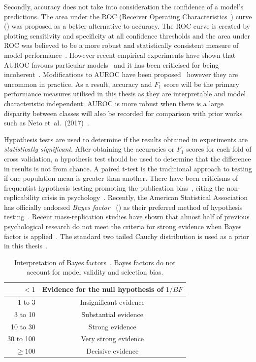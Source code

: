 \documentclass[12pt, twoside]{book}
\renewcommand\emph[1]{\textit{\color{USred}{#1}}}
\begin{document}
Secondly, accuracy does not take into consideration the confidence of a model's predictions. The area under the ROC (Receiver Operating Characteristics~\cite{rocauc}) curve (\emph{AUROC}) was proposed as a better alternative to accuracy. The ROC curve is created by plotting sensitivity and specificity at all confidence thresholds and the area under ROC was believed to be a more robust and statistically consistent measure of model performance~\cite{aucgood}. However recent empirical experiments have shown that AUROC favours particular models~\cite{aucmislead2} and it has been criticised for being incoherent~\cite{aucmislead, aucincoherent}. Modifications to AUROC have been proposed~\cite{aucmislead2, aucincoherent} however they are uncommon in practice. As a result, accuracy and $F_1$ score will be the primary performance measures utilised in this thesis as they are interpretable and model characteristic independent. AUROC is more robust when there is a large disparity between classes will also be recorded for comparison with prior works such as Neto et~al.~(2017)~\cite{mpowerneto2017analysis}.


Hypothesis tests are used to determine if the results obtained in experiments are \textit{statistically significant}. After obtaining the accuracies or $F_1$ scores for each fold of cross validation, a hypothesis test should be used to determine that the difference in results is not from chance. A paired t-test is the traditional approach to testing if one population mean is greater than another. There have been criticisms of frequentist hypothesis testing promoting the publication bias~\cite{publicationbias}, citing the non-replicability crisis in psychology~\cite{replicability}. Recently, the American Statistical Association has officially endorsed \textit{Bayes factor}~\cite{bayesianttests} (\emph{BF}) as their preferred method of hypothesis testing~\cite{bayesfactorASA}. Recent mass-replication studies have shown that almost half of previous psychological research do not meet the criteria for strong evidence when Bayes factor is applied~\cite{bayesfactorempirical}. The standard two tailed Cauchy distribution is used as a prior in this thesis~\cite{bayesianttests}.


\begin{table}[h]
	\caption{Interpretation of Bayes factors~\cite{bayesfactorinterpretation}. Bayes factors do not account for model validity and selection bias.}
	\label{bayesfactorinterpretation}
	\centering
\begin{tabular}{@{}rc@{}}
	$<1$ &  Evidence for the null hypothesis of $1/BF$\\ \midrule
	1 to 3 &  Insignificant evidence\\ \midrule
	3 to 10 & Substantial evidence \\ \midrule
	10 to 30    & Strong evidence    \\\midrule
	30 to 100 & Very strong evidence\\\midrule
	$\geq 100$ & Decisive evidence \\\midrule
\end{tabular}
\end{table}
\end{document}
